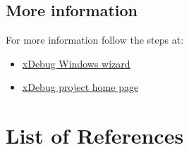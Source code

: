 \documentclass[a4paperpaper,openright]{book}
\begin{document}
\hypertarget{more-information}{%
\section{More information}\label{more-information}}

For more information follow the steps at:

\begin{itemize}
\item
  \href{https://xdebug.org/wizard.php}{xDebug Windows wizard}
\item
  \href{https://xdebug.org/}{xDebug project home page}
\end{itemize}

\backmatter

\hypertarget{list-of-references}{%
\chapter{List of References}\label{list-of-references}}
\end{document}
